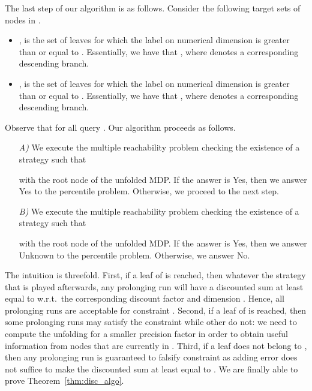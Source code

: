 \documentclass{llncs}
\begin{document}
The last step of our algorithm is as follows. Consider the  following target sets of nodes in .
\begin{itemize}
\item ,  is the set of leaves for which the label on numerical dimension  is greater than or equal to . Essentially, we have that , where  denotes a corresponding descending branch.
\item ,  is the set of leaves for which the label on numerical dimension  is greater than or equal to . Essentially, we have that , where  denotes a corresponding descending branch.
\end{itemize}
Observe that  for all query . Our algorithm proceeds as follows.
\begin{itemize}
\item[\textit{A)}] We execute the multiple reachability problem checking the existence of a strategy  such that

with  the root node of the unfolded MDP. If the answer is \textsf{Yes}, then we answer \textsf{Yes} to the percentile problem. Otherwise, we proceed to the next step.
\item[\textit{B)}]  We execute the multiple reachability problem checking the existence of a strategy  such that 

with  the root node of the unfolded MDP. If the answer is \textsf{Yes}, then we answer \textsf{Unknown} to the percentile problem. Otherwise, we answer \textsf{No}.
\end{itemize}

The intuition is threefold. First, if a leaf of  is reached, then whatever the strategy that is played afterwards, any prolonging run will have a discounted sum at least equal to  w.r.t.~the corresponding discount factor  and dimension . Hence, all prolonging runs are acceptable for constraint . Second, if a leaf of  is reached, then some prolonging runs may satisfy the constraint while other do not: we need to compute the unfolding for a smaller precision factor  in order to obtain useful information from nodes that are currently in . Third, if a leaf does not belong to , then any prolonging run is guaranteed to falsify constraint  as adding error  does not suffice to make the discounted sum at least equal to . We are finally able to prove Theorem~\ref{thm:disc_algo}.
\end{document}

